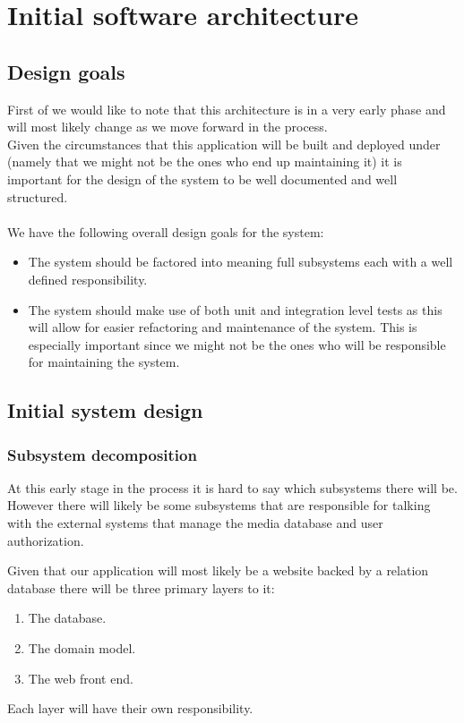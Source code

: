 \documentclass[12pt]{article}
\begin{document}
\section{Initial software architecture}
\subsection{Design goals}
First of we would like to note that this architecture is in a very early phase
and will most likely change as we move forward in the process.\\
Given the circumstances that this application will be built and deployed under (namely that we might not be the ones who end up maintaining it) it is important for the design of the system to be well documented and well structured.\\\\
We have the following overall design goals for the system:
\begin{itemize}
  \item The system should be factored into meaning full subsystems each with a well defined responsibility.
  \item The system should make use of both unit and integration level tests as this will allow for easier refactoring and maintenance of the system. This is especially important since we might not be the ones who will be responsible for maintaining the system.
\end{itemize}
\subsection{Initial system design}
\subsubsection{Subsystem decomposition}
At this early stage in the process it is hard to say which subsystems there will be. However there will likely be some subsystems that are responsible for talking with the external systems that manage the media database and user authorization.

Given that our application will most likely be a website backed by a relation database there will be three primary layers to it:

\begin{enumerate}
  \item The database.
  \item The domain model.
  \item The web front end.
\end{enumerate}
Each layer will have their own responsibility.
\end{document}
